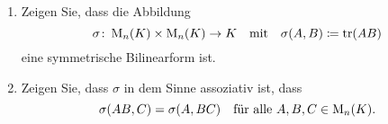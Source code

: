 \documentclass[a4paper,10pt]{scrartcl}
\begin{document}
\begin{question}
  \begin{enumerate}[leftmargin=*]
    \item
      Zeigen Sie, dass die Abbildung
      \[
        \sigma \colon \operatorname{M}_n(K) \times \operatorname{M}_n(K) \to K
        \quad\text{mit}\quad
        \sigma(A, B) \coloneqq \operatorname{tr}(AB)
      \]
      eine symmetrische Bilinearform ist.
    \item
      Zeigen Sie, dass $\sigma$ in dem Sinne assoziativ ist, dass
      \[
        \sigma(AB, C) = \sigma(A, BC)
        \quad
        \text{für alle $A, B, C \in \operatorname{M}_n(K)$}.
      \]
  \end{enumerate}
\end{question}
\end{document}
